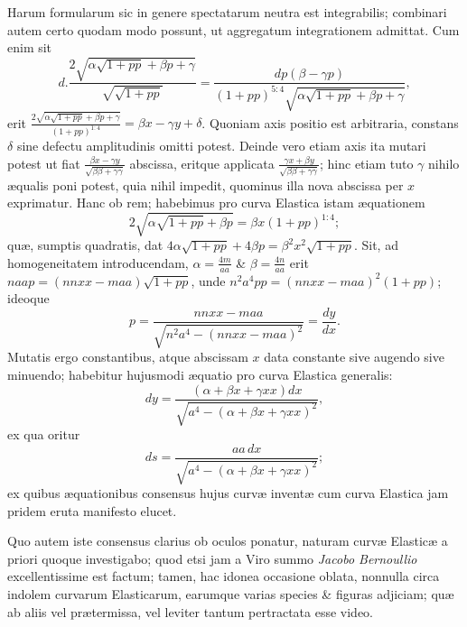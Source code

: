 Harum formularum sic in genere spectatarum neutra est integrabilis; combinari autem certo quodam modo possunt, ut aggregatum integrationem admittat. Cum enim sit
\[d.\frac{2\sqrt{\alpha\sqrt{1+pp}+\beta p+\gamma}}{\sqrt{\sqrt{1+pp}}}=\frac{dp(\beta-\gamma p)}{(1+pp)^{5:4}\sqrt{\alpha\sqrt{1+pp}+\beta p+\gamma}},\]
erit $\frac{2\sqrt{\alpha\sqrt{1+pp}+\beta p+\gamma}}{(1+pp)^{1:4}}=\beta x-\gamma y+\delta$. Quoniam axis positio est arbitraria, constans $\delta$ sine defectu amplitudinis omitti potest. Deinde vero etiam axis ita mutari potest ut fiat $\frac{\beta x-\gamma y}{\sqrt{\beta\beta+\gamma\gamma}}$ abscissa, eritque applicata $\frac{\gamma x+\beta y}{\sqrt{\beta\beta+\gamma\gamma}}$; hinc etiam tuto $\gamma$ nihilo æqualis poni potest, quia nihil impedit, quominus illa nova abscissa per $x$ exprimatur. Hanc ob rem; habebimus pro curva Elastica istam æquationem
\[2\sqrt{\alpha\sqrt{1+pp}+\beta p}=\beta x(1+pp)^{1:4};\]
quæ, sumptis quadratis, dat $4\alpha\sqrt{1+pp}+4\beta p=\beta^2x^2\sqrt{1+pp}$. Sit, ad homogeneitatem introducendam, $\alpha=\frac{4m}{aa}$ \& $\beta=\frac{4n}{aa}$ erit $naap=(nnxx-maa)\sqrt{1+pp}$, unde $n^2a^4pp=(nnxx-maa)^2(1+pp)$; ideoque
\[p=\frac{nnxx-maa}{\sqrt{n^2a^4-(nnxx-maa)^2}}=\frac{dy}{dx}.\]
Mutatis ergo constantibus, atque abscissam $x$ data constante sive augendo sive minuendo; habebitur hujusmodi æquatio pro curva Elastica generalis:
\[dy=\frac{(\alpha+\beta x+\gamma xx)dx}{\sqrt{a^4-(\alpha+\beta x+\gamma xx)^2}},\]
ex qua oritur
\[ds=\frac{aa\,dx}{\sqrt{a^4-(\alpha+\beta x+\gamma xx)^2}};\]
ex quibus æquationibus consensus hujus curvæ inventæ cum curva Elastica jam pridem eruta manifesto elucet.

Quo autem iste consensus clarius ob oculos ponatur, naturam curvæ Elasticæ a priori quoque investigabo; quod etsi jam a Viro summo \textit{Jacobo Bernoullio} excellentissime est factum; tamen, hac idonea occasione oblata, nonnulla circa indolem curvarum Elasticarum, earumque varias species \& figuras adjiciam; quæ ab aliis vel prætermissa, vel leviter tantum pertractata esse video.

